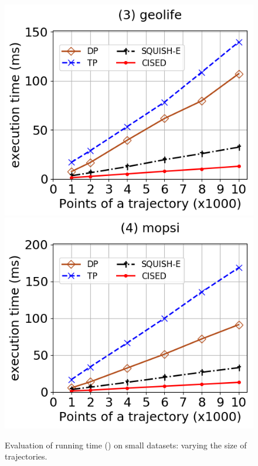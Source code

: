 \begin{figure}[tb!]
	\includegraphics[scale=0.315]{Figures/Exp-SED-time-size-geolife.png}	\hspace{1ex}
	\includegraphics[scale=0.315]{Figures/Exp-SED-time-size-mopsi.png}	\hspace{1ex}
	\vspace{-3ex}
	\caption{\small Evaluation of running time (\sed) on small datasets: varying the size of trajectories.}\label{fig:time-size-sed}
	\vspace{-2ex}
\end{figure}

